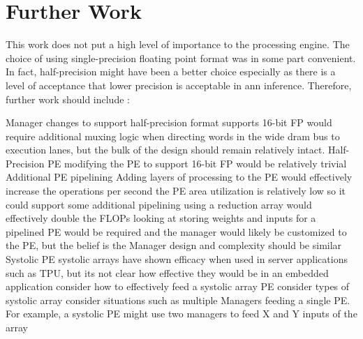 \documentclass[journal]{IEEEtran}
\begin{document}
\section{Further Work}
\label{sec:Further Work}
This work does not put a high level of importance to the processing engine. The choice of using single-precision floating point format was in some part convenient. In fact, half-precision might have been a better choice especially as there
is a level of acceptance that lower precision is acceptable in \ac{ann} inference.
Therefore, further work should include :
\begin {outline}
  \1 Manager changes to support half-precision format
    \2 supports 16-bit FP would require additional muxing logic when directing words in the wide \ac{dram} bus to execution lanes, but the bulk of the design should remain relatively intact.
  \1 Half-Precision PE
    \2 modifying the PE to support 16-bit FP would be relatively trivial
  \1 Additional PE pipelining
    \2 Adding layers of processing to the PE would effectively increase the operations per second
      \3 the PE area utilization is relatively low so it could support some additional pipelining
      \3 using a reduction array would effectively double the FLOPs
      \3 looking at storing weights and inputs for a pipelined PE would be required and the manager would likely be customized to the PE, but the belief is the Manager design and complexity should be similar
  \1 Systolic PE
    \2 systolic arrays have shown efficacy when used in server applications such as TPU, but its not clear how effective they would be in an embedded application
      \3 consider how to effectively feed a systolic array PE
      \3 consider types of systolic array
      \3 consider situations such as multiple Managers feeding a single PE. For example, a systolic PE might use two managers to feed X and Y inputs of the array
 
\end{outline}
\fi


\ifCLASSOPTIONcaptionsoff
  \newpage
\fi



\end{document}
